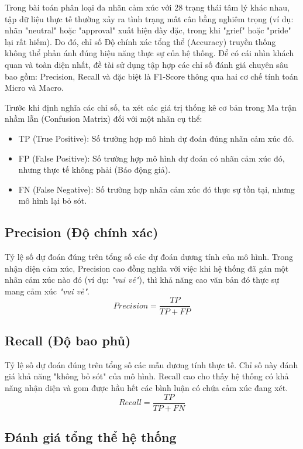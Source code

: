 Trong bài toán phân loại đa nhãn cảm xúc với 28 trạng thái tâm lý khác nhau, tập dữ liệu thực tế thường xảy ra tình trạng mất cân bằng nghiêm trọng (ví dụ: nhãn "neutral" hoặc "approval" xuất hiện dày đặc, trong khi "grief" hoặc "pride" lại rất hiếm). Do đó, chỉ số Độ chính xác tổng thể (Accuracy) truyền thống không thể phản ánh đúng hiệu năng thực sự của hệ thống. Để có cái nhìn khách quan và toàn diện nhất, đề tài sử dụng tập hợp các chỉ số đánh giá chuyên sâu bao gồm: Precision, Recall và đặc biệt là F1-Score thông qua hai cơ chế tính toán Micro và Macro.

Trước khi định nghĩa các chỉ số, ta xét các giá trị thống kê cơ bản trong Ma trận nhầm lẫn (Confusion Matrix) đối với một nhãn cụ thể:
\begin{itemize}
	\item TP (True Positive): Số trường hợp mô hình dự đoán đúng nhãn cảm xúc đó.
	
	\item FP (False Positive): Số trường hợp mô hình dự đoán có nhãn cảm xúc đó, nhưng thực tế không phải (Báo động giả).
	\item FN (False Negative): Số trường hợp nhãn cảm xúc đó thực sự tồn tại, nhưng mô hình lại bỏ sót.
\end{itemize}

\subsection{Precision (Độ chính xác)}

Tỷ lệ số dự đoán đúng trên tổng số các dự đoán dương tính của mô hình. Trong nhận diện cảm xúc, Precision cao đồng nghĩa với việc khi hệ thống đã gán một nhãn cảm xúc nào đó (ví dụ: \textit{"vui vẻ"}), thì khả năng cao văn bản đó thực sự mang cảm xúc \textit{"vui vẻ"}.
$$
Precision = \frac{TP}{TP+FP}
$$

\subsection{Recall (Độ bao phủ)}

Tỷ lệ số dự đoán đúng trên tổng số các mẫu dương tính thực tế. Chỉ số này đánh giá khả năng "không bỏ sót" của mô hình. Recall cao cho thấy hệ thống có khả năng nhận diện và gom được hầu hết các bình luận có chứa cảm xúc đang xét.
$$
Recall = \frac{TP}{TP+FN}
$$

\subsection{Đánh giá tổng thể hệ thống}

